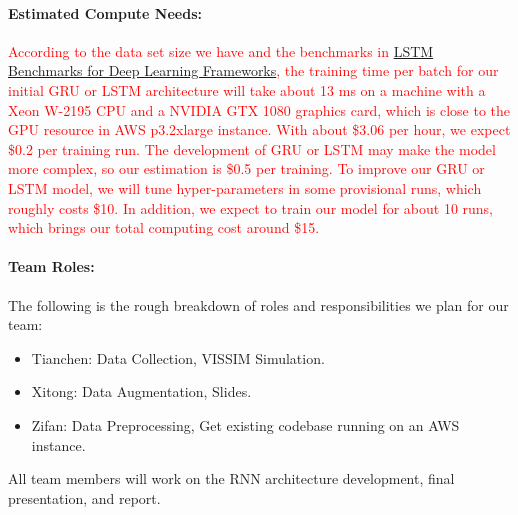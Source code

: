 \documentclass[11pt]{article}
\begin{document}
\paragraph{Estimated Compute Needs:}  
\textcolor{red}{According to the data set size we have and the benchmarks in \href{https://arxiv.org/pdf/1806.01818.pdf}{LSTM Benchmarks for Deep Learning Frameworks}, the training time per batch for our initial GRU or LSTM architecture will take about 13 ms on a machine with a Xeon W-2195 CPU and a NVIDIA GTX 1080 graphics card, which is close to the GPU resource in AWS p3.2xlarge instance. With about \$3.06 per hour, we expect \$0.2 per training run. The development of GRU or LSTM may make the model more complex, so our estimation is \$0.5 per training. To improve our GRU or LSTM model, we will tune hyper-parameters in some provisional runs, which roughly costs \$10. In addition, we expect to train our model for about 10 runs, which brings our total computing cost around \$15.}


\paragraph{Team Roles:} The following is the rough breakdown of roles and responsibilities we plan for our team:
\begin{itemize}
\item Tianchen: Data Collection, VISSIM Simulation.
\item Xitong: Data Augmentation, Slides.
\item Zifan: Data Preprocessing, Get existing codebase running on an AWS instance.
\end{itemize}
All team members will work on the RNN architecture development, final presentation, and report.  


\end{document}
